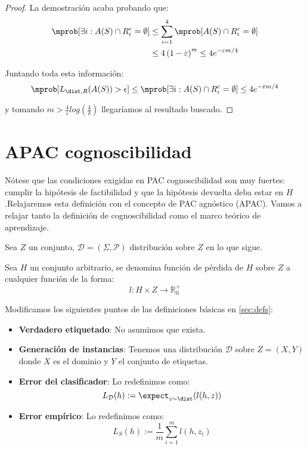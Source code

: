 \begin{example}
\begin{proof}
    La demostración acaba probando que:
    \begin{align*}
    \mprob [\exists i : A(S)\cap R_i^c = \emptyset] &\le \sum_{i=1}^4 \mprob[A(S)\cap R_i^c = \emptyset] \\
                                                    &\le 4 \left(1-\varepsilon \right)^m \le 4e^{-\varepsilon m/4}
    \end{align*}

    Juntando toda esta información: 
    \[\mprob[L_{\dist,R}(A(S)) > \epsilon] \le \mprob [\exists i : A(S)\cap R_i^c = \emptyset] \le 4e^{-\varepsilon m/4}\]
                                    
    y tomando $m > \frac{4}{\varepsilon} log \left( \frac{4}{\delta} \right)$ llegaríamos al resultado buscado.
    \end{proof}
\end{example}

\section{APAC cognoscibilidad}

Nótese que las condiciones exigidas en PAC cognoscibilidad son muy fuertes: cumplir la hipótesis de factibilidad y que 
la hipótesis devuelta deba estar en $H$.Relajaremos esta definición con el concepto de PAC agnóstico (APAC).
Vamos a relajar tanto la definición de cognoscibilidad como el marco teórico de aprendizaje.

Sea $Z$ un conjunto, $\mathcal{D} = (\Sigma, \mathcal{P})$ distribución sobre $Z$ en lo que sigue.

\begin{definition}
Sea $H$ un conjunto arbitrario, se denomina función de pérdida de $H$ sobre $Z$ a cualquier función de la 
forma:
\[l : H \times Z \rightarrow \mathbb{R}_0^{+}\]
\end{definition}

Modificamos los siguientes puntos de las definiciones básicas en \ref{sec:defs}:

\begin{itemize}
  \item \textbf{Verdadero etiquetado}: No asumimos que exista.

  \item \textbf{Generación de instancias}: Tenemos una distribución $\mathcal{D}$ sobre $Z = (X,Y)$ donde $X$ es el dominio
  y $Y$ el conjunto de etiquetas.
  \item \textbf{Error del clasificador}: Lo redefinimos como:
  \[L_{\mathcal{D}}(h) :=  \expect_{z\sim \dist} (l(h,z))\]
  
  \item \textbf{Error empírico}: Lo redefinimos como:
  \[L_{S} (h) := \frac{1}{m} \sum_{i=1}^m l(h,z_i)\]
\end{itemize}


